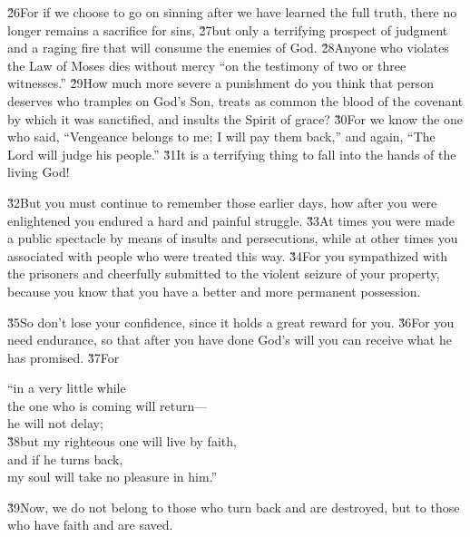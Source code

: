 \v{26}For if we choose to go on sinning after we have learned the full truth, there no longer remains a sacrifice for sins, \v{27}but only a terrifying prospect of judgment and a raging fire that will consume the enemies of God. \v{28}Anyone who violates the Law of Moses dies without mercy ``on the testimony of two or three witnesses.'' \v{29}How much more severe a punishment do you think that person deserves who tramples on God's Son, treats as common the blood of the covenant by which it was sanctified, and insults the Spirit of grace? \v{30}For we know the one who said, ``Vengeance belongs to me; I will pay them back,'' and again, ``The Lord will judge his people.'' \v{31}It is a terrifying thing to fall into the hands of the living God!

\v{32}But you must continue to remember those earlier days, how after you were enlightened you endured a hard and painful struggle. \v{33}At times you were made a public spectacle by means of insults and persecutions, while at other times you associated with people who were treated this way. \v{34}For you sympathized with the prisoners and cheerfully submitted to the violent seizure of your property, because you know that you have a better and more permanent possession.

\v{35}So don't lose your confidence, since it holds a great reward for you. \v{36}For you need endurance, so that after you have done God's will you can receive what he has promised. \v{37}For

\begin{poetry}
\poeml ``in a very little while \\
\poemll    the one who is coming will return--- \\
\poemlll       he will not delay; \\
\poeml \v{38}but my righteous one will live by faith, \\
\poemll    and if he turns back, \\
\poemlll       my soul will take no pleasure in him.''
\end{poetry}

\v{39}Now, we do not belong to those who turn back and are destroyed, but to those who have faith and are saved.


